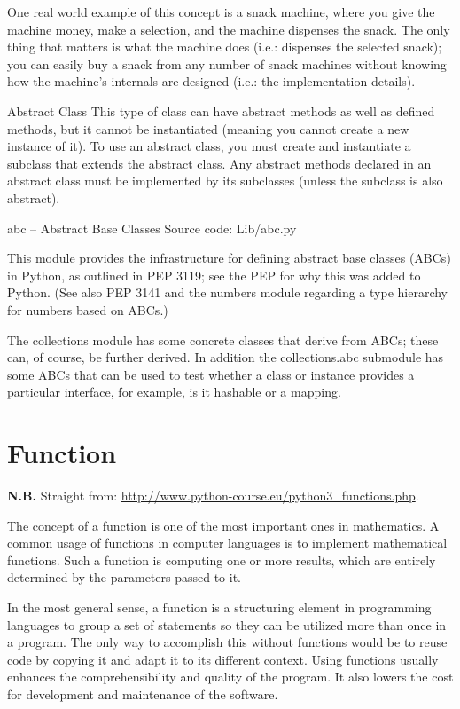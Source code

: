 \documentclass[11pt,a4paper]{article}
\begin{document}
One real world example of this concept is a snack machine, where you
give the machine money, make a selection, and the machine dispenses
the snack. The only thing that matters is what the machine does (i.e.:
dispenses the selected snack); you can easily buy a snack from any
number of snack machines without knowing how the machine's internals
are designed (i.e.: the implementation details).

Abstract Class This type of class can have abstract methods as well as
defined methods, but it cannot be instantiated (meaning you cannot
create a new instance of it). To use an abstract class, you must
create and instantiate a subclass that extends the abstract class. Any
abstract methods declared in an abstract class must be implemented by
its subclasses (unless the subclass is also abstract).

 abc -- Abstract Base Classes
Source code: Lib/abc.py

This module provides the infrastructure for defining abstract base classes (ABCs) in Python, as outlined in PEP 3119; see the PEP for why this was added to Python. (See also PEP 3141 and the numbers module regarding a type hierarchy for numbers based on ABCs.)

The collections module has some concrete classes that derive from ABCs; these can, of course, be further derived. In addition the collections.abc submodule has some ABCs that can be used to test whether a class or instance provides a particular interface, for example, is it hashable or a mapping.




\newpage
\section{Function}
{\bf N.B.} Straight from: \href{http://www.python-course.eu/python3\_functions.php}{http://www.python-course.eu/python3\_functions.php}. 

The concept of a function is one of the most important ones in
mathematics. A common usage of functions in computer languages is to
implement mathematical functions. Such a function is computing one or
more results, which are entirely determined by the parameters passed
to it.

In the most general sense, a function is a structuring element in
programming languages to group a set of statements so they can be
utilized more than once in a program. The only way to accomplish this
without functions would be to reuse code by copying it and adapt it to
its different context. Using functions usually enhances the
comprehensibility and quality of the program. It also lowers the cost
for development and maintenance of the software.
\end{document}
